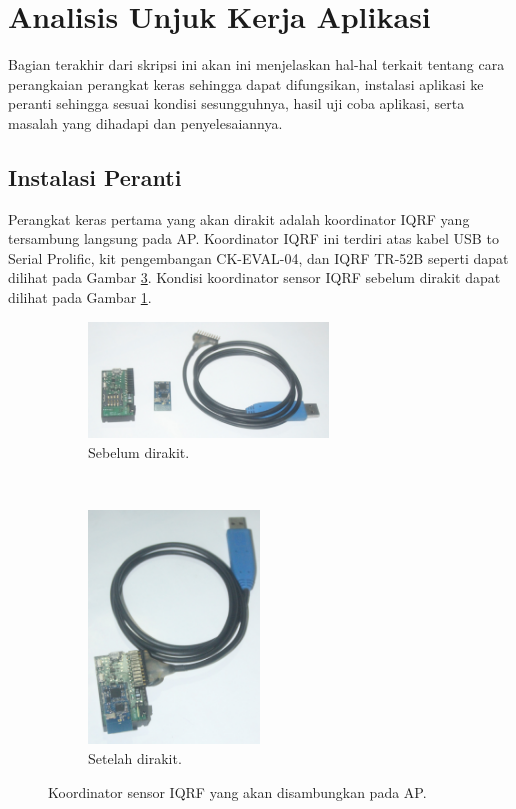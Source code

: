 	\section{Analisis Unjuk Kerja Aplikasi}
		Bagian terakhir dari skripsi ini akan ini menjelaskan hal-hal terkait tentang cara perangkaian perangkat keras sehingga dapat difungsikan, instalasi aplikasi ke peranti sehingga sesuai kondisi sesungguhnya, hasil uji coba aplikasi, serta masalah yang dihadapi dan penyelesaiannya.

		\subsection{Instalasi Peranti}
			Perangkat keras pertama yang akan dirakit adalah koordinator IQRF yang tersambung langsung pada AP. Koordinator IQRF ini terdiri atas kabel USB to Serial Prolific, kit pengembangan CK-EVAL-04, dan IQRF TR-52B seperti dapat dilihat pada Gambar \ref{iqrf-coordinator}. Kondisi koordinator sensor IQRF sebelum dirakit dapat dilihat pada Gambar \ref{iqrf-stripped}.

			\begin{figure}[H]
				\begin{subfigure}[b]{\textwidth}
					\centering
				    \includegraphics[width=0.7\textwidth]{gambar/iqrf-stripped}
				    \caption{Sebelum dirakit.}
				    \label{iqrf-stripped}
				\end{subfigure}
				 ~
				\begin{subfigure}[b]{\textwidth}
					\centering
				    \includegraphics[width=0.5\textwidth]{gambar/iqrf-complete}
				    \caption{Setelah dirakit.}
				    \label{iqrf-complete}
				\end{subfigure}
				\caption{Koordinator sensor IQRF yang akan disambungkan pada AP.}
				\label{iqrf-coordinator}
			\end{figure}


